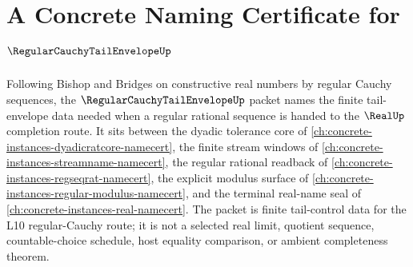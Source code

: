 \chapter{A Concrete Naming Certificate for $\RegularCauchyTailEnvelopeUp$}
\label{ch:concrete-instances-regular-cauchy-tail-envelope-namecert}

Following Bishop and Bridges on constructive real numbers by regular Cauchy sequences, the $\RegularCauchyTailEnvelopeUp$ packet names the finite tail-envelope data needed when a regular rational sequence is handed to the $\RealUp$ completion route. It sits between the dyadic tolerance core of \autoref{ch:concrete-instances-dyadicratcore-namecert}, the finite stream windows of \autoref{ch:concrete-instances-streamname-namecert}, the regular rational readback of \autoref{ch:concrete-instances-regseqrat-namecert}, the explicit modulus surface of \autoref{ch:concrete-instances-regular-modulus-namecert}, and the terminal real-name seal of \autoref{ch:concrete-instances-real-namecert}. The packet is finite tail-control data for the L10 regular-Cauchy route; it is not a selected real limit, quotient sequence, countable-choice schedule, host equality comparison, or ambient completeness theorem.

